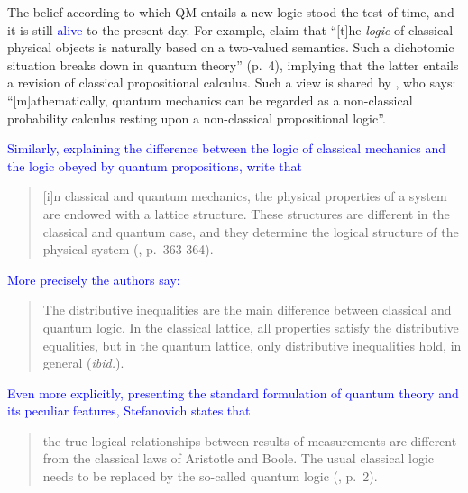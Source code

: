 \documentclass[11pt, executivepaper]{article}
\begin{document}
The belief according to which QM entails a new logic stood the test of time, and it is still \textcolor{blue}{alive} to the present day. For example, \cite{Giuntini:2018} claim that ``[t]he \emph{logic} of classical physical objects is naturally based on a two-valued semantics. Such a dichotomic situation breaks down in quantum theory'' (p.\ 4), implying that the latter entails a revision of classical propositional calculus. Such a view is shared by \cite{Wilce:2021}, who says: ``[m]athematically, quantum mechanics can be regarded as a non-classical probability calculus resting upon a non-classical propositional logic''. \textcolor{blue}{Similarly, explaining the difference between the logic of classical mechanics and the logic obeyed by quantum propositions, \cite{Holik:2019} write that
\begin{quote}
[i]n classical and quantum mechanics, the physical properties of a system are endowed with a lattice structure. These structures are different in the classical
and quantum case, and they determine the logical structure of the physical system (\cite{Holik:2019}, p.\ 363-364).
\end{quote}
\noindent More precisely the authors say:
\begin{quote}
The distributive inequalities are the main difference between classical and quantum logic. In the classical lattice, all properties satisfy the distributive equalities, but in the quantum lattice, only distributive inequalities hold, in general (\emph{ibid.}).
\end{quote}
}

\textcolor{blue}{Even more explicitly, presenting the standard formulation of quantum theory and its peculiar features, Stefanovich states that
\begin{quote}
the true logical relationships between results of measurements are different from the classical laws of Aristotle and Boole. The usual classical logic needs to be replaced by the so-called quantum logic (\cite{Stefanovich:2019}, p.\ 2).
\end{quote}
}
\end{document}
